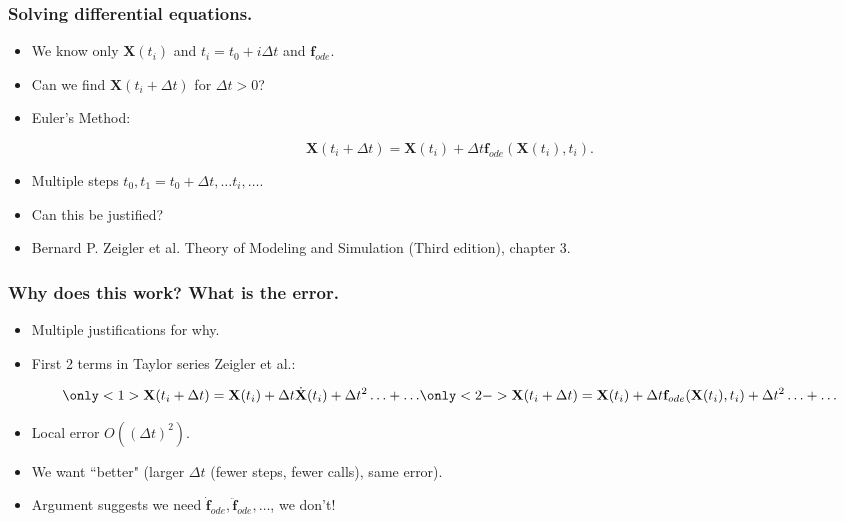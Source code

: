 \documentclass{beamer}
\begin{document}
\begin{frame}
\frametitle{Solving differential equations.}
\begin{itemize}

\item<1-> We know only $\mathbf{X}(t_i)$ and $t_i= t_0+i \Delta t$ and $\mathbf{f}_{ode}$.

\item<2-> Can we find $\mathbf{X}(t_i+\Delta t)$ for $\Delta t>0$?

\item<3-> Euler's Method:

\begin{equation*}
\mathbf{X}(t_i+\Delta t) = \mathbf{X}(t_i)+\Delta t \mathbf{f}_{ode}(\mathbf{X}(t_i),t_i).
\end{equation*}

\item<3-> Multiple steps $t_0,t_1=t_0+\Delta t,\ldots t_i,\ldots$.

\item<4-> Can this be justified?

\item<1-> {\color{gray} Bernard P. Zeigler et al. Theory of Modeling and Simulation (Third edition), chapter 3.}
\end{itemize}
\end{frame}


\begin{frame}
\frametitle{Why does this work? What is the error.}
\begin{itemize}
\item<1-> Multiple justifications for why.

\item<2-> First 2 terms in Taylor series {{\color{gray} Zeigler et al.}}:

\begin{equation*}
\only<1>{\mathbf{X}(t_{i}+\Delta t) = \mathbf{X}(t_{i})+\Delta t \dot{\mathbf{X}}(t_i)+\Delta t^2\ldots +\ldots}
\only<2->{\mathbf{X}(t_{i}+\Delta t) = \mathbf{X}(t_{i})+\Delta t \mathbf{f}_{ode}(\mathbf{X}(t_i),t_i)+\Delta t^2\ldots +\ldots}
\end{equation*}

\item<3-> Local error  $O((\Delta t)^{2})$.

\item<4-> We want ``better" (larger $\Delta t$  (fewer steps, fewer calls), same error).

\item<5-> Argument suggests we need $\dot{\mathbf{f}}_{ode},\ddot{\mathbf{f}}_{ode},\ldots$, we don't!
\end{itemize}
\end{frame}
\end{document}
